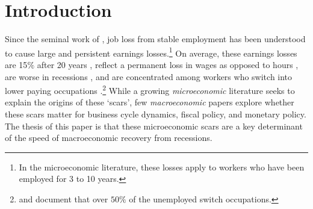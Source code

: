 
\section{Introduction}
Since the seminal work of \cite{Jacobson1993}, job loss from stable employment has been understood to cause large and persistent earnings losses.\footnote{In the microeconomic literature, these losses apply to workers who have been employed for 3 to 10 years.} On average, these earnings losses are 15$\%$ after 20 years \citep[e.g.][]{DavisVonWachter2011, Huckfeldt2022}, reflect a permanent loss in wages as opposed to hours \citep[e.g.][]{Moore2019, Lachowska2020,Huckfeldt2022}, are worse in recessions \citep{DavisVonWachter2011, Schmieder2023}, and are concentrated among workers who switch into lower paying occupations \citep{Huckfeldt2022}.\footnote{\cite{Huckfeldt2022} and \cite{Fujita2017} document that over $50\%$ of the unemployed switch occupations. } While a growing \textit{microeconomic} literature seeks to explain the origins of these `scars', few \textit{macroeconomic} papers explore whether these scars matter for business cycle dynamics, fiscal policy, and monetary policy. The thesis of this paper is that these microeconomic scars are a key determinant of the speed of macroeconomic recovery from recessions.


